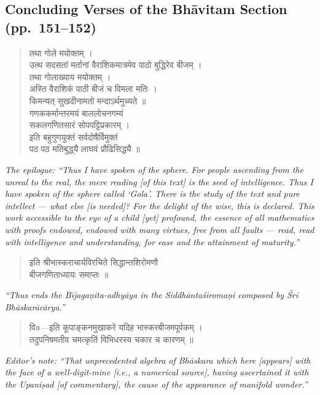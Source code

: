 \documentclass[11pt,a4paper]{article}
\newcommand{\cnote}[1]{\textcolor{notecolor}{\textit{#1}}}
\newcommand{\dev}[1]{{\devanagarifont #1}}
\newenvironment{sanskritverse}{%
  \begin{quote}
}{%
  \end{quote}
}
\begin{document}
\subsection*{Concluding Verses of the Bhāvitam Section (pp.\ 151--152)}

\begin{sanskritverse}
\dev{%
तथा गोले मयोक्तम् ।\\
उत्थ सदसतां मर्तानां वैराशिकमात्रमेव पाठो बुद्धिरेव बीजम् ।\\
तथा गोलाख्याय मयोक्तम् ।\\[0.3em]
अस्ति वैराशिकं पाठी बीजं च विमला मतिः ।\\
किमन्यत् सुखदीनामतो मन्दाऽर्थमुच्यते ॥\\[0.3em]
गणककर्मान्तरमयं बाललोचनगम्यं\\
सकलगणितसारं सोपपट्टिप्रकारम् ।\\
इति बहुगुणयुक्तं सर्वदोषैर्विमुक्तं\\
पठ पठ मतिबुद्ध्‌यै लाघवं प्रौढिसिद्ध्यै ॥}
\end{sanskritverse}

\cnote{The epilogue: ``Thus I have spoken of the sphere. For people ascending from the unreal to the real, the mere reading [of this text] is the seed of intelligence. Thus I have spoken of the sphere called `Gola'. There is the study of the text and pure intellect --- what else [is needed]? For the delight of the wise, this is declared. This work accessible to the eye of a child [yet] profound, the essence of all mathematics with proofs endowed, endowed with many virtues, free from all faults --- read, read with intelligence and understanding, for ease and the attainment of maturity.''}

\begin{sanskritverse}
\dev{%
इति श्रीभास्कराचार्यविरचिते सिद्धान्तशिरोमणौ\\
बीजगणिताध्यायः समाप्तः ॥}
\end{sanskritverse}

\cnote{``Thus ends the Bījagaṇita-adhyāya in the Siddhāntaśiromaṇi composed by Śrī Bhāskarācārya.''}

\bigskip

\begin{sanskritverse}
\dev{%
वि०—इति कूपाङ्कनमुखाकरे यदिह भास्करबीजमपूर्वकम् ।\\
तदुपनिषमतीव चमत्कृतिं विभिधरस्य चकार च कारणम् ॥}
\end{sanskritverse}

\cnote{Editor's note: ``That unprecedented algebra of Bhāskara which here [appears] with the face of a well-digit-mine [i.e., a numerical source], having ascertained it with the Upaniṣad [of commentary], the cause of the appearance of manifold wonder.''}
\end{document}

